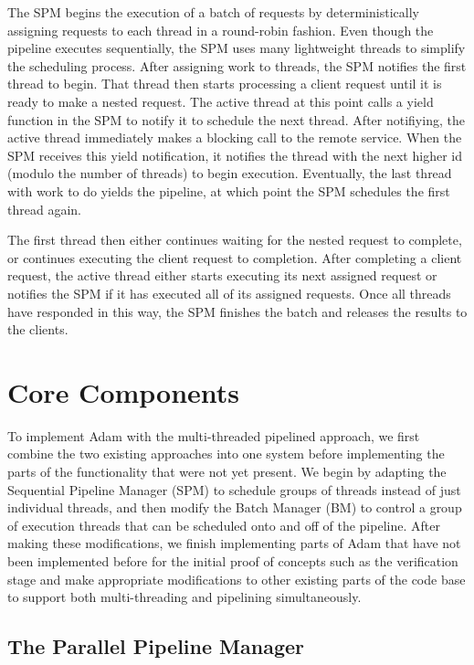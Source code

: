 \documentclass[11pt, oneside]{report}
\begin{document}
The SPM begins the execution of a batch of requests by deterministically assigning requests to each thread in a round-robin fashion.
Even though the pipeline executes sequentially, the SPM uses many lightweight threads to simplify the scheduling process. 
After assigning work to threads, the SPM notifies the first thread to begin. 
That thread then starts processing a client request until it is ready to make a nested request. 
The active thread at this point calls a yield function in the SPM to notify it to schedule the next thread. 
After notifiying, the active thread immediately makes a blocking call to the remote service. 
When the SPM receives this yield notification, it notifies the thread with the next higher id (modulo the number of threads) to begin execution. 
Eventually, the last thread with work to do yields the pipeline, at which point the SPM schedules the first thread again. 

The first thread then either continues waiting for the nested request to complete, or continues executing the client request to completion. 
After completing a client request, the active thread either starts executing its next assigned request or notifies the SPM if it has executed all of its assigned requests.
Once all threads have responded in this way, the SPM finishes the batch and releases the results to the clients.

\section{Core Components}

To implement Adam with the multi-threaded pipelined approach, we first combine the two existing approaches into one system before implementing the parts of the functionality that were not yet present. 
We begin by adapting the Sequential Pipeline Manager (SPM) to schedule groups of threads instead of just individual threads, and then modify the Batch Manager (BM) to control a group of execution threads that can be scheduled onto and off of the pipeline.
After making these modifications, we finish implementing parts of Adam that have not been implemented before for the initial proof of concepts such as the verification stage and make appropriate modifications to other existing parts of the code base to support both multi-threading and pipelining simultaneously.

\subsection{The Parallel Pipeline Manager}
\end{document}
